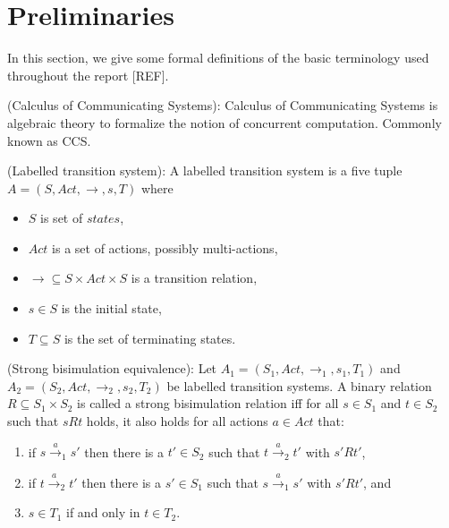 \section{Preliminaries}
\label{sec:preliminaries}

In this section, we give some formal definitions of the basic terminology used throughout the report [REF].

\begin{definition}
(Calculus of Communicating Systems): Calculus of Communicating Systems is algebraic theory to formalize the notion of concurrent computation. Commonly known as CCS.
\end{definition}

\begin{definition}
(Labelled transition system): A labelled transition system is a five tuple $A=\left(S, Act, \rightarrow, s, T \right)$ where
\begin{itemize}
	\item $S$ is set of $states$,
	\item $Act$ is a set of actions, possibly multi-actions,
	\item $\rightarrow \subseteq S \times Act \times S$ is a transition relation,
	\item $s \in S$ is the initial state,
	\item $T \subseteq S$ is the set of terminating states.	
\end{itemize}
\end{definition}

\begin{definition}
(Strong bisimulation equivalence): Let $A_{1}=\left(S_{1}, Act, \rightarrow_{1}, s_{1}, T_{1}\right)$ and $A_{2}=\left(S_{2}, Act, \rightarrow_{2}, s_{2}, T_{2}\right)$ be labelled transition systems. A binary relation $R \subseteq S_{1} \times S_{2}$ is called a strong bisimulation relation iff for all $s \in S_{1}$ and $t \in S_{2}$ such that $sRt$ holds, it also holds for all actions $a \in Act$ that:
\begin{enumerate}
\item if $s\stackrel{a}{\rightarrow}_{1}s'$ then there is a $t' \in S_{2}$ such that $t\stackrel{a}{\rightarrow}_{2}t'$ with $s'Rt'$,
\item if $t\stackrel{a}{\rightarrow}_{2}t'$ then there is a $s' \in S_{1}$ such that $s\stackrel{a}{\rightarrow}_{1}s'$ with $s'Rt'$, and
\item $s \in T_{1}$ if and only in $t \in T_{2}$.
\end{enumerate}
\end{definition}

